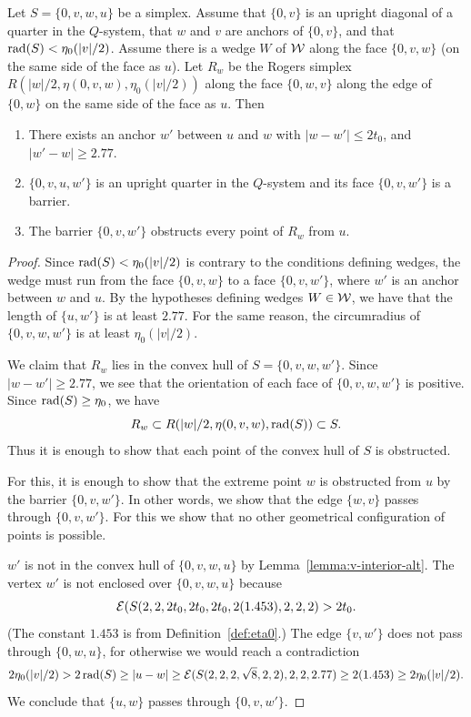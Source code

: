 \begin{lemma}\label{lemma:prev}
Let $S=\{0,v,w,u\}$ be a simplex.  Assume that $\{0,v\}$ is an
upright diagonal of a quarter in the $Q$-system, that $w$ and $v$
are anchors of $\{0,v\}$, and that $\operatorname{rad}(S)< \eta_0(|v|/2)$.
Assume there is a wedge $W$ of ${\mathcal W}$ along the face $\{0,v,w\}$
(on the same side of the face as $u$).  Let $R_w$ be the Rogers
simplex $R(|w|/2,\eta(0,v,w),\eta_0(|v|/2))$ along the face
$\{0,w,v\}$ along the edge of $\{0,w\}$ on the same side of the
face as $u$.  Then
\begin{enumerate}
\item There exists an anchor $w'$ between $u$ and $w$ with
    $|w-w'|\le 2t_0$, and $|w'-w|\ge2.77$.
\item $\{0,v,u,w'\}$ is an upright quarter in the $Q$-system and
its face $\{0,v,w'\}$ is a barrier.
 \item  The barrier $\{0,v,w'\}$ obstructs every point of $R_w$
 from $u$.
\end{enumerate}
\end{lemma}


\begin{proof}
Since $\operatorname{rad}(S) <\eta_0(|v|/2)$ is contrary to the conditions
defining wedges, the wedge must run from the face $\{0,v,w\}$ to a
face $\{0,v,w'\}$, where $w'$ is an anchor between $w$ and $u$. By
the hypotheses defining wedges $W\in{\mathcal W}$, we have that the
length of $\{u,w'\}$ is at least $2.77$. For the same reason, the
circumradius of $\{0,v,w,w'\}$ is at least $\eta_0(|v|/2)$.


We claim that $R_w$ lies in the convex hull of $S=\{0,v,w,w'\}$.
Since $|w-w'|\ge 2.77$, we see that the orientation of each face
of $\{0,v,w,w'\}$ is positive.  Since ${\operatorname{rad}}(S)\ge \eta_0$, we
have
  $$
  R_w \subset R(|w|/2,\eta(0,v,w),{\operatorname{rad}}(S)) \subset S.
  $$
Thus it is enough to show that each point of the convex hull of
$S$ is obstructed.

For this, it is enough to show that the extreme point $w$ is
obstructed from $u$ by the barrier $\{0,v,w'\}$.  In other words,
we show that the edge $\{w,v\}$ passes through $\{0,v,w'\}$.  For
this we show that no other geometrical configuration of points is
possible.

$w'$ is not in the convex hull of $\{0,v,w,u\}$ by
Lemma~\ref{lemma:v-interior-alt}. The vertex $w'$ is not enclosed
over $\{0,v,w,u\}$ because
    $$
    {\mathcal E}(S(2,2,2t_0,2t_0,2t_0,2(1.453),2,2,2)> 2t_0.
    $$
(The constant $1.453$ is from Definition~\ref{def:eta0}.)  The
edge $\{v,w'\}$ does not pass through $\{0,w,u\}$, for otherwise
we would reach a contradiction
    $$
    2\eta_0(|v|/2) > 2\operatorname{rad}(S) \ge |u-w| \ge
    {\mathcal E}(S(2,2,2,\sqrt8,2,2),2,2,2.77) \ge 2(1.453) \ge
    2\eta_0(|v|/2).
    $$
We conclude that $\{u,w\}$ passes through $\{0,v,w'\}$.
\end{proof}

